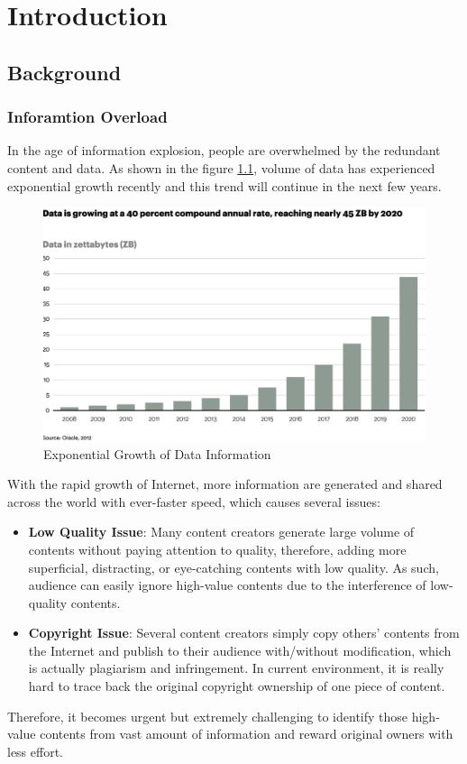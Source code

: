 \chapter{Introduction}
\section{Background}
\subsection{Inforamtion Overload}
In the age of information explosion, people are overwhelmed by the redundant content and data. As shown in the figure \ref{fig:data}, volume of data has experienced exponential growth recently and this trend will continue in the next few years.

\vspace{5pt}
\begin{figure}
\centering
\includegraphics[width=\linewidth]{data_grow.png}
\caption{Exponential Growth of Data Information}
\label{fig:data}
\end{figure}


With the rapid growth of Internet, more information are generated and shared across the world with ever-faster speed, which causes several issues:
\begin{itemize}
\item \textbf{Low Quality Issue}: Many content creators generate large volume of contents without paying attention to quality, therefore, adding more superficial, distracting, or eye-catching contents with low quality. As such, audience can easily ignore high-value contents due to the interference of low-quality contents. 
\item \textbf{Copyright Issue}: Several content creators simply copy others' contents from the Internet and publish to their audience with/without modification, which is actually plagiarism and infringement. In current environment, it is really hard to trace back the original copyright ownership of one piece of content. 

\end{itemize}
Therefore, it becomes urgent but extremely challenging to identify those high-value contents from vast amount of information and reward original owners with less effort. 

